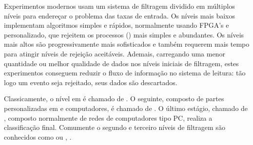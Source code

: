 Experimentos modernos usam um sistema de filtragem dividido em múltiplos
níveis para endereçar o problema das taxas de entrada. Os níveis mais baixos
implementam algoritmos simples e rápidos, normalmente usando FPGA's e
 personalizado, que rejeitem os processos ()
mais simples e abundantes. Os níveis mais altos são progressivamente mais
sofisticados e também requerem mais tempo para atingir níveis de rejeição
aceitáveis. Ademais, carregando uma menor quantidade ou melhor qualidade de
dados nos níveis iniciais de filtragem, estes experimentos conseguem reduzir o
fluxo de informação no sistema de leitura: tão logo um evento seja rejeitado,
seus dados são descartados.

Classicamente, o nível em  é chamado de . O
seguinte, composto de partes personalizadas em  e computadores,
é chamado de . O último estágio, chamado de
, composto normalmente de redes de computadores
tipo PC, realiza a classificação final. Comumente o segundo e terceiro níveis
de filtragem são conhecidos como  ou
, .
